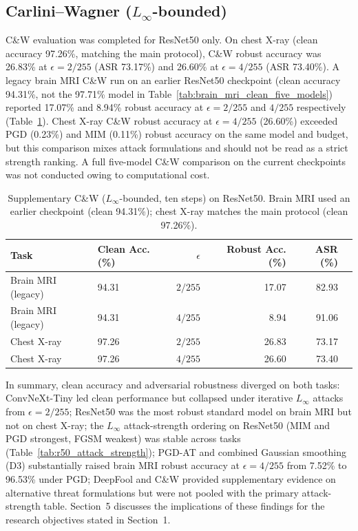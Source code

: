 \documentclass[12pt,a4paper,oneside]{report}
\begin{document}
\subsection{Carlini--Wagner ($L_\infty$-bounded)}
\label{sec:results-cw}

C\&W evaluation was completed for ResNet50 only. On chest X-ray (clean accuracy 97.26\%, matching the main protocol), C\&W robust accuracy was 26.83\% at $\epsilon = 2/255$ (ASR 73.17\%) and 26.60\% at $\epsilon = 4/255$ (ASR 73.40\%). A legacy brain MRI C\&W run on an earlier ResNet50 checkpoint (clean accuracy 94.31\%, not the 97.71\% model in Table~\ref{tab:brain_mri_clean_five_models}) reported 17.07\% and 8.94\% robust accuracy at $\epsilon = 2/255$ and $4/255$ respectively (Table~\ref{tab:cw_r50_supplementary}). Chest X-ray C\&W robust accuracy at $\epsilon = 4/255$ (26.60\%) exceeded PGD (0.23\%) and MIM (0.11\%) robust accuracy on the same model and budget, but this comparison mixes attack formulations and should not be read as a strict strength ranking. A full five-model C\&W comparison on the current checkpoints was not conducted owing to computational cost.

\begin{table}[htbp]
  \centering
  \caption{Supplementary C\&W ($L_\infty$-bounded, ten steps) on ResNet50. Brain MRI used an earlier checkpoint (clean 94.31\%); chest X-ray matches the main protocol (clean 97.26\%).}
  \label{tab:cw_r50_supplementary}
  \begin{tabular}{llrrrr}
    \toprule
    Task & Clean Acc. (\%) & $\epsilon$ & Robust Acc. (\%) & ASR (\%) \\
    \midrule
    Brain MRI (legacy) & 94.31 & $2/255$ & 17.07 & 82.93 \\
    Brain MRI (legacy) & 94.31 & $4/255$ &  8.94 & 91.06 \\
    Chest X-ray        & 97.26 & $2/255$ & 26.83 & 73.17 \\
    Chest X-ray        & 97.26 & $4/255$ & 26.60 & 73.40 \\
    \bottomrule
  \end{tabular}
\end{table}

In summary, clean accuracy and adversarial robustness diverged on both tasks: ConvNeXt-Tiny led clean performance but collapsed under iterative $L_\infty$ attacks from $\epsilon = 2/255$; ResNet50 was the most robust standard model on brain MRI but not on chest X-ray; the $L_\infty$ attack-strength ordering on ResNet50 (MIM and PGD strongest, FGSM weakest) was stable across tasks (Table~\ref{tab:r50_attack_strength}); PGD-AT and combined Gaussian smoothing (D3) substantially raised brain MRI robust accuracy at $\epsilon = 4/255$ from 7.52\% to 96.53\% under PGD; DeepFool and C\&W provided supplementary evidence on alternative threat formulations but were not pooled with the primary attack-strength table. Section~5 discusses the implications of these findings for the research objectives stated in Section~1.
\end{document}
